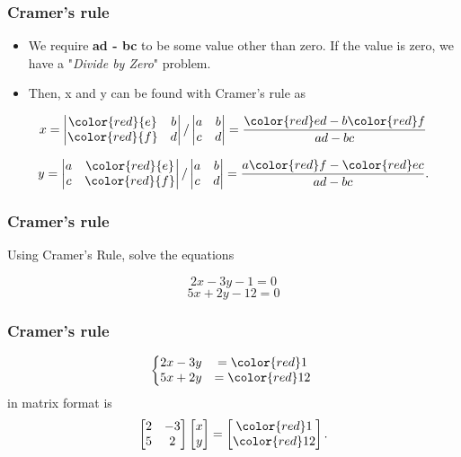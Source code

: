\documentclass{beamer}
\begin{document}
\begin{frame}
\frametitle{Cramer's rule}
\Large
\begin{itemize}
\item We require \textbf{ad - bc}  to be some value other than zero. If the value is zero, we have a "\textit{Divide by Zero}" problem.

\item Then, x and y can be found with Cramer's rule as
\end{itemize}
\[x = \begin{vmatrix} \color{red}{e} & b \\ \color{red}{f} & d \end{vmatrix}/\begin{vmatrix} a & b \\ c & d \end{vmatrix}  = { {\color{red}e}d - b{\color{red}f} \over ad - bc} \]

\[y = \begin{vmatrix} a & \color{red}{e} \\ c & \color{red}{f} \end{vmatrix}/\begin{vmatrix} a & b \\ c & d \end{vmatrix}  = { a{\color{red}f} - {\color{red}e}c \over ad - bc}.\]
\end{frame}



\begin{frame}
	\frametitle{Cramer's rule}
	\Large
\vspace{-2cm}	
	Using Cramer's Rule, solve the equations 
	
	\[ 2x-3y-1 = 0 \]
	\[ 5x +2y -12 = 0 \]
	
\end{frame}

\begin{frame}
	\frametitle{Cramer's rule}
	\Large
	\vspace{-2.5cm}
		\[ \left\{\begin{matrix}2x-3y&={\color{red}1}\\ 5x +2y &= {\color{red}12}\end{matrix}\right.\  \] in matrix format is \[ \begin{bmatrix} 2 & -3 \\ 5 & 2 \end{bmatrix}\begin{bmatrix} x \\ y \end{bmatrix}=\begin{bmatrix} {\color{red}1} \\ {\color{red}12} \end{bmatrix}.\]
\end{frame}
\end{document}
